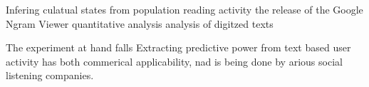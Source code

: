 Infering culatual states from population reading activity 
 the release of the Google Ngram Viewer quantitative analysis analysis of digitzed texts


The experiment at hand falls 
Extracting predictive power from text based user activity has both commerical applicability, nad is being done by arious social listening companies.

